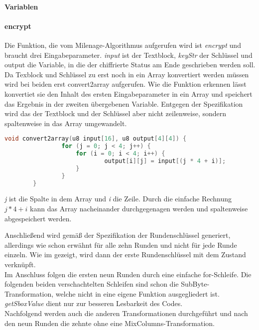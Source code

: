 		\paragraph{Variablen}
 
		\paragraph{encrypt}
		Die Funktion, die vom Milenage-Algorithmus aufgerufen wird ist \emph{encrypt} und
		braucht drei Eingabeparameter. \emph{input} ist der Textblock, \emph{keyStr} der
		Schlüssel und output die Variable, in die der chiffrierte Status am Ende geschrieben
		werden soll. \\
		Da Texblock und Schlüssel zu erst noch in ein Array konvertiert werden müssen
		wird bei beiden erst convert2array aufgerufen. Wie die Funktion erkennen lässt
		konvertiet sie den Inhalt des ersten Eingabeparameter in ein Array und speichert das
		Ergebnis in der zweiten übergebenen Variable. Entgegen der Spezifikation wird das
		der Textblock und der Schlüssel aber nicht zeilenweise, sondern spaltenweise in das
		Array umgewandelt.

		\begin{lstlisting}[language=C]
		void convert2array(u8 input[16], u8 output[4][4]) {
    			for (j = 0; j < 4; j++) {
        			for (i = 0; i < 4; i++) {
            				output[i][j] = input[(j * 4 + i)];
        			}
    			}
		} 
        	\end{lstlisting}

		\emph{j} ist die Spalte in dem Array und \emph{i} die Zeile. Durch die einfache
		Rechnung $j*4+i$ kann das Array nacheinander durchgegenagen werden und spaltenweise
		abgespeichert werden. 

		Anschließend wird gemäß der Spezifikation der Rundenschlüssel generiert, allerdings
		wie schon erwähnt für alle zehn Runden und nicht für jede Runde einzeln. Wie im
		 gezeigt, wird dann der erste Rundenschlüssel mit dem
		Zustand verknüpft. \\
		Im Anschluss folgen die ersten neun Runden durch eine einfache for-Schleife. Die
		folgenden beiden verschachtelten Schleifen sind schon die SubByte-Transformation,
		welche nicht in eine eigene Funktion ausgegliedert ist. \emph{getSboxValue} dient
		nur zur besseren Lesbarkeit des Codes. \\
		Nachfolgend werden auch die anderen Transformationen durchgeführt und nach den neun
		Runden die zehnte ohne eine MixColumns-Transformation.

